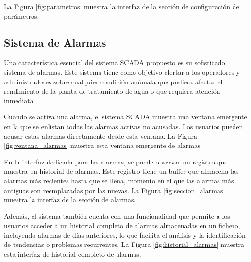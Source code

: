 La Figura \ref{fig:parametros} muestra la interfaz de la sección de configuración de parámetros.

\begin{figure}[h!]
    \centering
\end{figure}


\subsection{Sistema de Alarmas}

Una característica esencial del sistema SCADA propuesto es su sofisticado sistema de alarmas. Este sistema tiene como objetivo alertar a los operadores y administradores sobre cualquier condición anómala que pudiera afectar el rendimiento de la planta de tratamiento de agua o que requiera atención inmediata.

Cuando se activa una alarma, el sistema SCADA muestra una ventana emergente en la que se enlistan todas las alarmas activas no acusadas. Los usuarios pueden acusar estas alarmas directamente desde esta ventana. La Figura \ref{fig:ventana_alarmas} muestra esta ventana emergente de alarmas.

\begin{figure}[h!]
    \centering
\end{figure}

En la interfaz dedicada para las alarmas, se puede observar un registro que muestra un historial de alarmas. Este registro tiene un buffer que almacena las alarmas más recientes hasta que se llena, momento en el que las alarmas más antiguas son reemplazadas por las nuevas. La Figura \ref{fig:seccion_alarmas} muestra la interfaz de la sección de alarmas.

\begin{figure}[h!]
    \centering
\end{figure}

Además, el sistema también cuenta con una funcionalidad que permite a los usuarios acceder a un historial completo de alarmas almacenadas en un fichero, incluyendo alarmas de días anteriores, lo que facilita el análisis y la identificación de tendencias o problemas recurrentes. La Figura \ref{fig:historial_alarmas} muestra esta interfaz de historial completo de alarmas.

